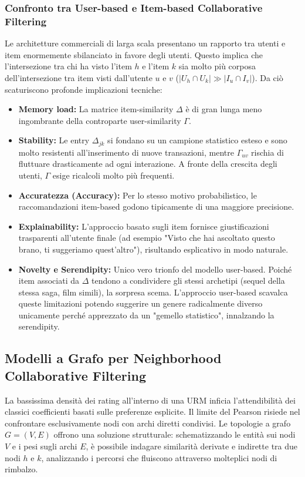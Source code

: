 \subsubsection{Confronto tra User-based e Item-based Collaborative Filtering}
Le architetture commerciali di larga scala presentano un rapporto tra utenti e item enormemente sbilanciato in favore degli utenti. Questo implica che l'intersezione tra chi ha visto l'item $h$ e l'item $k$ sia molto più corposa dell'intersezione tra item visti dall'utente $u$ e $v$ ($\vert{}U_h \cap U_k\vert{} \gg \vert{}I_u \cap I_v\vert{}$).
Da ciò scaturiscono profonde implicazioni tecniche:
\begin{itemize}
\item \textbf{Memory load:} La matrice item-similarity $\Delta$ è di gran lunga meno ingombrante della controparte user-similarity $\Gamma$.
\item \textbf{Stability:} Le entry $\Delta_{jk}$ si fondano su un campione statistico esteso e sono molto resistenti all'inserimento di nuove transazioni, mentre $\Gamma_{uv}$ rischia di fluttuare drasticamente ad ogni interazione. A fronte della crescita degli utenti, $\Gamma$ esige ricalcoli molto più frequenti.
\item \textbf{Accuratezza (Accuracy):} Per lo stesso motivo probabilistico, le raccomandazioni item-based godono tipicamente di una maggiore precisione.
\item \textbf{Explainability:} L'approccio basato sugli item fornisce giustificazioni trasparenti all'utente finale (ad esempio "Visto che hai ascoltato questo brano, ti suggeriamo quest'altro"), risultando esplicativo in modo naturale.
\item \textbf{Novelty e Serendipity:} Unico vero trionfo del modello user-based. Poiché item associati da $\Delta$ tendono a condividere gli stessi archetipi (sequel della stessa saga, film simili), la sorpresa scema. L'approccio user-based scavalca queste limitazioni potendo suggerire un genere radicalmente diverso unicamente perché apprezzato da un "gemello statistico", innalzando la serendipity.
\end{itemize}

\subsection{Modelli a Grafo per Neighborhood Collaborative Filtering}
La bassissima densità dei rating all'interno di una URM inficia l'attendibilità dei classici coefficienti basati sulle preferenze esplicite. Il limite del Pearson risiede nel confrontare esclusivamente nodi con archi diretti condivisi.
Le topologie a grafo $G = (V,E)$ offrono una soluzione strutturale: schematizzando le entità sui nodi $V$ e i pesi sugli archi $E$, è possibile indagare similarità derivate e indirette tra due nodi $h$ e $k$, analizzando i percorsi che fluiscono attraverso molteplici nodi di rimbalzo.

